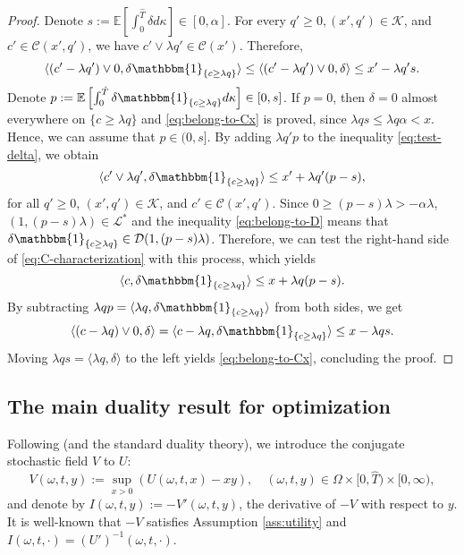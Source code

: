 \documentclass[11pt, oneside]{article}   	%
\theoremstyle{plain}
\theoremstyle{definition}
\theoremstyle{remark}
\begin{document}
\begin{proof}
Denote $s:=\mathbb{E}\left[\int_0^{\hat{T}} \delta d\kappa\right]\in[0,\alpha]$. For every $q'\geq 0, (x',q')\in\mathcal{K}$, and $c'\in\mathcal{C}(x',q')$, we have $c'\vee\lambda q'\in\mathcal{C}(x')$. Therefore,
\begin{equation}\label{eq:test-delta}
\langle (c'-\lambda q')\vee0, \delta\mathbbm{1}_{\{c\geq\lambda q\}}\rangle \leq \langle (c'-\lambda q')\vee 0,\delta \rangle\leq x'-\lambda q's.
\end{equation}
Denote $p:=\mathbb{E}\left[\int_0^{\hat{T}} \delta\mathbbm{1}_{\{c\geq\lambda q\}} d\kappa\right]\in[0,s]$. If $p=0$, then $\delta=0$ almost everywhere on $\{c\geq\lambda q\}$ and \eqref{eq:belong-to-Cx} is proved, since $\lambda qs\leq \lambda q\alpha<x$.
Hence, we can assume that $p\in(0,s]$. By adding $\lambda q'p$ to the inequality \eqref{eq:test-delta}, we obtain
\begin{equation}\label{eq:belong-to-D}
\langle c'\vee\lambda q', \delta\mathbbm{1}_{\{c\geq\lambda q\}}\rangle \leq x'+\lambda q'(p-s),
\end{equation}
for all  $q'\geq 0$, $(x',q')\in\mathcal{K}$, and $c'\in\mathcal{C}(x',q')$. Since $0\geq (p-s)\lambda>-\alpha\lambda$, $(1,(p-s)\lambda)\in\mathcal{L}^*$ and the inequality \eqref{eq:belong-to-D} means that $\delta\mathbbm{1}_{\{c\geq\lambda q\}}\in\mathcal{D}(1,(p-s)\lambda)$. Therefore, we can test the right-hand side of \eqref{eq:C-characterization} with this process, which yields
$$\langle c, \delta\mathbbm{1}_{\{c\geq\lambda q\}}\rangle\leq x+\lambda q(p-s).$$
By subtracting $\lambda qp=\langle\lambda q,\delta\mathbbm{1}_{\{c\geq\lambda q\}} \rangle$ from both sides, we get
$$\langle (c-\lambda q)\vee 0,\delta \rangle=\langle c-\lambda q,\delta\mathbbm{1}_{\{c\geq\lambda q\}} \rangle\leq x-\lambda qs.$$
Moving $\lambda qs=\langle\lambda q,\delta \rangle$ to the left yields \eqref{eq:belong-to-Cx}, concluding the proof.
\end{proof}




\subsection{The main duality result for optimization}\label{sec:duality-sol}

Following \cite{mostovyi} (and the standard duality theory), we introduce the conjugate stochastic field $V$ to $U$:
$$V(\omega,t,y):=\sup_{x>0}(U(\omega,t,x)-xy),\quad (\omega,t,y)\in\Omega\times[0,\hat{T})\times[0,\infty),$$
and denote by $I(\omega,t,y):=-V'(\omega,t,y)$, the derivative of $-V$ with respect to $y$. It is well-known that $-V$ satisfies Assumption \ref{ass:utility} and $I(\omega,t,\cdot)=(U')^{-1}(\omega,t,\cdot)$.
\end{document}

